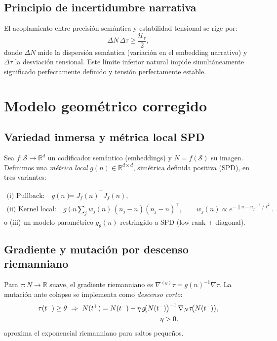 \documentclass[10pt,a4paper,twocolumn]{article}
\theoremstyle{definition}
\theoremstyle{plain}
\begin{document}
\subsection{Principio de incertidumbre narrativa}
El acoplamiento entre precisión semántica y estabilidad tensional se rige por:
\begin{equation}
\Delta N\,\Delta\tau \ge \frac{\mathcal{U}_\tau}{2},
\label{eq:uncertainty_narrative}
\end{equation}
donde \(\Delta N\) mide la dispersión semántica (variación en el embedding narrativo) y \(\Delta\tau\) la desviación tensional. Este límite inferior natural impide simultáneamente significado perfectamente definido y tensión perfectamente estable.

\section{Modelo geométrico corregido}
\label{sec:geom}
\subsection{Variedad inmersa y métrica local SPD}
Sea $f:\mathcal{S}\to\mathbb{R}^d$ un codificador semántico (embeddings) y $N=f(\mathcal{S})$ su imagen.
Definimos una \emph{métrica local} $g(n)\in\mathbb{R}^{d\times d}$, simétrica definida positiva (SPD), en tres variantes:

\begin{subequations}\label{eq:metricas}
\begin{align}
\text{(i) Pullback:}\quad
g(n) &= J_f(n)^\top J_f(n), \label{eq:pullback}\\[2pt]
\text{(ii) Kernel local:}\quad
g(n) &= \sum_{j} w_j(n)\,(n_j-n)(n_j-n)^\top, \qquad
w_j(n)\propto e^{-\|n-n_j\|^2/\ell^2}. \label{eq:kernelSPD}
\end{align}
\end{subequations}
\noindent
o (iii) un modelo paramétrico $g_\theta(n)$ restringido a SPD (low-rank + diagonal).

\subsection{Gradiente y mutación por descenso riemanniano}
Para \(\tau:N\to\mathbb{R}\) suave, el gradiente riemanniano es \(\nabla^{(g)}\tau = g(n)^{-1}\nabla\tau\). La mutación ante colapso se implementa como \emph{descenso corto}:
\begin{equation}
\begin{aligned}
\tau(t^-)\ge \theta \ \Rightarrow\ 
N(t^+) &= N(t^-) - \eta\, g\!\big(N(t^-)\big)^{-1}\, \nabla_{N}\tau\!\big(N(t^-)\big),\\
&\hspace{8.6em} \eta>0.
\end{aligned}
\label{eq:riem-step}
\end{equation}
\noindent
{} aproxima el exponencial riemanniano para saltos pequeños.
\end{document}
